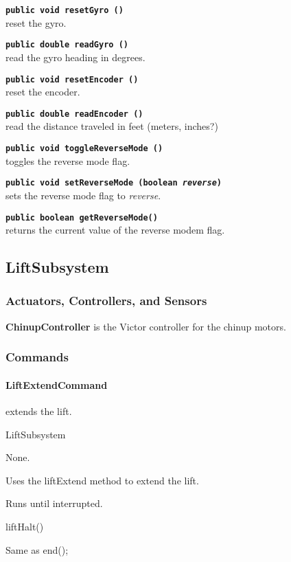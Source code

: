 \documentclass[]{article}
\begin{document}
\noindent \texttt{\textbf{public void resetGyro ()}} \\
reset the gyro.

\noindent \texttt{\textbf{public double readGyro ()}} \\
read the gyro heading in degrees.

\noindent \texttt{\textbf{public void resetEncoder ()}} \\
reset the encoder.

\noindent \texttt{\textbf{public double readEncoder ()}} \\
read the distance traveled in feet (meters, inches?)

\noindent \texttt{\textbf{public void toggleReverseMode ()}} \\
toggles the reverse mode flag.

\noindent \texttt{\textbf{public void setReverseMode (boolean \textit{reverse})}} \\
sets the reverse mode flag to \textit{reverse}.

\noindent \texttt{\textbf{public boolean getReverseMode()}} \\
returns the current value of the reverse modem flag.


\subsection{LiftSubsystem}

\subsubsection{Actuators, Controllers, and Sensors}

\textbf{ChinupController} is the Victor controller for the chinup motors.

\subsubsection{Commands}

\paragraph{LiftExtendCommand} extends the lift.
\begin{description}[topsep=0ex]
\item[requires] LiftSubsystem
\item[initialization]  None.
\item[execute] Uses the liftExtend method to extend the lift.
\item[isDone] Runs until interrupted.
\item[end] liftHalt()
\item[interrupted] Same as end();
\end{description}
\end{document}
